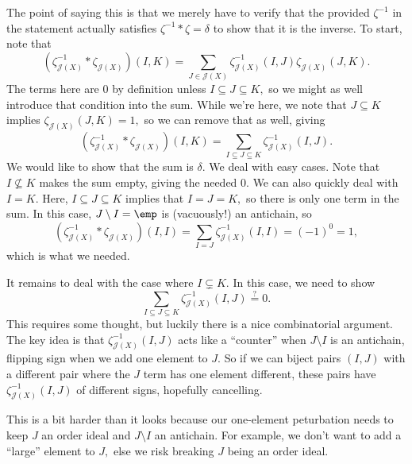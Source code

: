 The point of saying this is that we merely have to verify that the provided $\zeta^{-1}$ in the statement actually satisfies $\zeta^{-1}*\zeta=\delta$ to show that it is the inverse. To start, note that
\[\left(\zeta_{\mathcal J(X)}^{-1}*\zeta_{\mathcal J(X)}\right)(I,K)=\sum_{J\in\mathcal J(X)}\zeta_{\mathcal J(X)}^{-1}(I,J)\zeta_{\mathcal J(X)}(J,K).\]
The terms here are $0$ by definition unless $I\subseteq J\subseteq K,$ so we might as well introduce that condition into the sum. While we're here, we note that $J\subseteq K$ implies $\zeta_{\mathcal J(X)}(J,K)=1,$ so we can remove that as well, giving
\[\left(\zeta_{\mathcal J(X)}^{-1}*\zeta_{\mathcal J(X)}\right)(I,K)=\sum_{I\subseteq J\subseteq K}\zeta_{\mathcal J(X)}^{-1}(I,J).\]
We would like to show that the sum is $\delta.$ We deal with easy cases. Note that $I\not\subseteq K$ makes the sum empty, giving the needed $0.$ We can also quickly deal with $I=K.$ Here, $I\subseteq J\subseteq K$ implies that $I=J=K,$ so there is only one term in the sum. In this case, $J\setminus I=\emp$ is (vacuously!) an antichain, so
\[\left(\zeta_{\mathcal J(X)}^{-1}*\zeta_{\mathcal J(X)}\right)(I,I)=\sum_{I=J}\zeta_{\mathcal J(X)}^{-1}(I,I)=(-1)^0=1,\]
which is what we needed.

It remains to deal with the case where $I\subsetneq K.$ In this case, we need to show
\[\sum_{I\subseteq J\subseteq K}\zeta_{\mathcal J(X)}^{-1}(I,J)\stackrel?=0.\]
This requires some thought, but luckily there is a nice combinatorial argument. The key idea is that $\zeta_{\mathcal J(X)}^{-1}(I,J)$ acts like a ``counter'' when $J\setminus I$ is an antichain, flipping sign when we add one element to $J.$ So if we can biject pairs $(I,J)$ with a different pair where the $J$ term has one element different, these pairs have $\zeta_{\mathcal J(X)}^{-1}(I,J)$ of different signs, hopefully cancelling.

This is a bit harder than it looks because our one-element peturbation needs to keep $J$ an order ideal and $J\setminus I$ an antichain. For example, we don't want to add a ``large'' element to $J,$ else we risk breaking $J$ being an order ideal.

